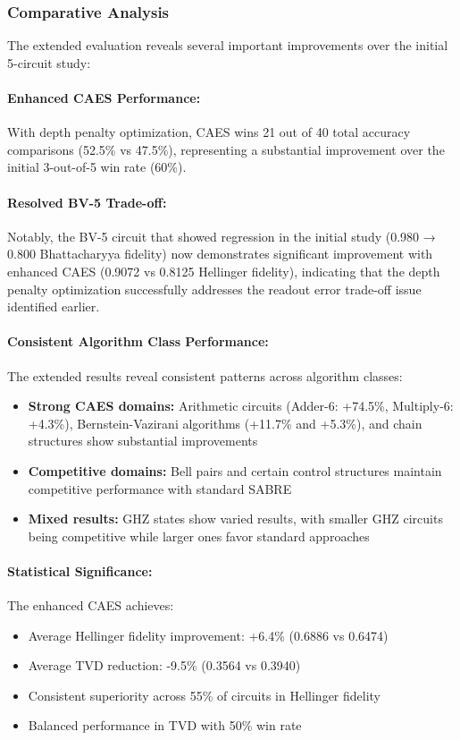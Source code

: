 \documentclass[conference]{IEEEtran}
\begin{document}
\subsubsection{Comparative Analysis}

The extended evaluation reveals several important improvements over the initial 5-circuit study:

\paragraph{Enhanced CAES Performance:} With depth penalty optimization, CAES wins 21 out of 40 total accuracy comparisons (52.5\% vs 47.5\%), representing a substantial improvement over the initial 3-out-of-5 win rate (60\%).

\paragraph{Resolved BV-5 Trade-off:} Notably, the BV-5 circuit that showed regression in the initial study (0.980 → 0.800 Bhattacharyya fidelity) now demonstrates significant improvement with enhanced CAES (0.9072 vs 0.8125 Hellinger fidelity), indicating that the depth penalty optimization successfully addresses the readout error trade-off issue identified earlier.

\paragraph{Consistent Algorithm Class Performance:} The extended results reveal consistent patterns across algorithm classes:
\begin{itemize}
    \item \textbf{Strong CAES domains:} Arithmetic circuits (Adder-6: +74.5\%, Multiply-6: +4.3\%), Bernstein-Vazirani algorithms (+11.7\% and +5.3\%), and chain structures show substantial improvements
    \item \textbf{Competitive domains:} Bell pairs and certain control structures maintain competitive performance with standard SABRE
    \item \textbf{Mixed results:} GHZ states show varied results, with smaller GHZ circuits being competitive while larger ones favor standard approaches
\end{itemize}

\paragraph{Statistical Significance:} The enhanced CAES achieves:
\begin{itemize}
    \item Average Hellinger fidelity improvement: +6.4\% (0.6886 vs 0.6474)
    \item Average TVD reduction: -9.5\% (0.3564 vs 0.3940)
    \item Consistent superiority across 55\% of circuits in Hellinger fidelity
    \item Balanced performance in TVD with 50\% win rate
\end{itemize}
\end{document}
